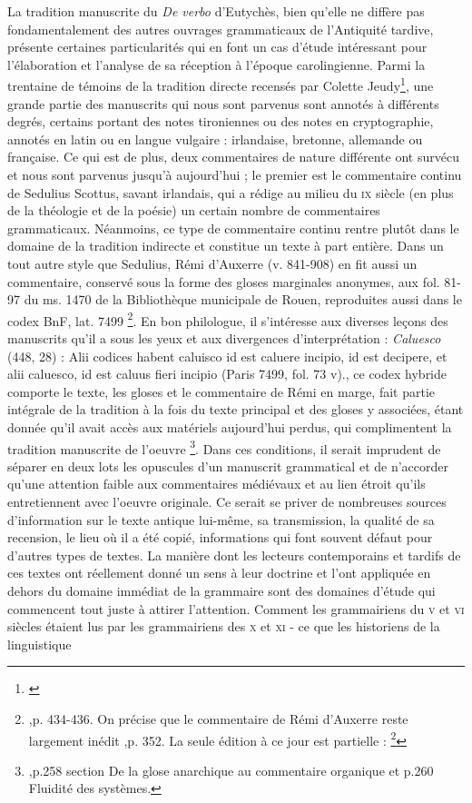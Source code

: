 \documentclass[a4paper, twoside, 12pt]{book}
\begin{document}
La tradition manuscrite du \textit{De verbo} d'Eutychès, bien qu'elle ne diffère pas fondamentalement des autres ouvrages grammaticaux de l'Antiquité tardive, présente certaines particularités qui en font un cas d'étude intéressant pour l'élaboration et l'analyse de sa réception à l'époque carolingienne. Parmi la trentaine de témoins de la tradition directe recensés par Colette Jeudy\footnote{\cite{jeudy1974manuscrits}}, une grande partie des manuscrits qui nous sont parvenus sont annotés à différents degrés, certains portant des notes tironiennes ou des notes en cryptographie, annotés en latin ou en langue vulgaire : irlandaise, bretonne, allemande ou française. Ce qui est de plus, deux commentaires de nature différente ont survécu et nous sont parvenus jusqu'à aujourd'hui ; le premier est le commentaire continu de Sedulius Scottus, savant irlandais, qui a rédige au milieu du \textsc{ix}\ieme{} siècle (en plus de la théologie et de la poésie) un certain nombre de commentaires grammaticaux. Néanmoins, ce type de commentaire continu rentre plutôt dans le domaine de la tradition indirecte et constitue un texte à part entière. Dans un tout autre style que Sedulius, Rémi d’Auxerre (v. 841-908) en fit aussi un commentaire, conservé sous la forme des gloses marginales anonymes, aux fol. 81-97 du ms. 1470 de la Bibliothèque municipale de Rouen, reproduites aussi dans le codex  BnF, lat. 7499 \footnote{\cite{jeudy1974manuscrits},p. 434-436. On précise que le commentaire de Rémi d'Auxerre reste largement inédit \cite{zetzel2018critics},p. 352. La seule édition à ce jour est partielle : \footnote{\cite{manitiusremigiusscholien}}}. En bon philologue, il s'intéresse aux diverses leçons  des  manuscrits qu'il a sous les yeux et aux divergences d'interprétation : \textit{Caluesco }(448, 28) : \og{} Alii codices habent caluisco id est caluere incipio, id est decipere, et alii caluesco, id  est caluus fieri incipio \fg{} (Paris 7499, fol. 73 v)., ce codex hybride comporte le texte, les gloses et le commentaire de Rémi en marge, fait partie intégrale de la tradition à la fois du texte principal et des gloses y associées, étant donnée qu'il avait accès aux matériels aujourd'hui perdus, qui complimentent la tradition manuscrite de l'oeuvre \footnote{\cite{holtz1978typologie},p.258 section \og{} De la glose anarchique au commentaire organique\fg{} et p.260 \og{} Fluidité des systèmes\fg{}.}. Dans ces conditions, il serait imprudent de séparer en deux lots les opuscules d'un manuscrit grammatical et de n'accorder qu'une attention faible aux commentaires médiévaux et au lien étroit qu'ils entretiennent avec l'oeuvre originale. Ce serait se priver de nombreuses sources d'information sur le texte antique lui-même, sa transmission, la qualité de sa recension, le lieu où il a été copié, informations qui font souvent défaut pour d'autres types de textes. La manière dont les lecteurs contemporains et tardifs de ces textes ont réellement donné un sens à leur doctrine et l'ont appliquée en dehors du domaine immédiat de la grammaire sont des domaines d'étude qui commencent tout juste à attirer l'attention. Comment les grammairiens du \textsc{v}\ieme{} et \textsc{vi}\ieme{} siècles étaient lus par les grammairiens des \textsc{x}\ieme{} et \textsc{xi}\ieme{} - ce que les historiens de la linguistique 
\end{document}
